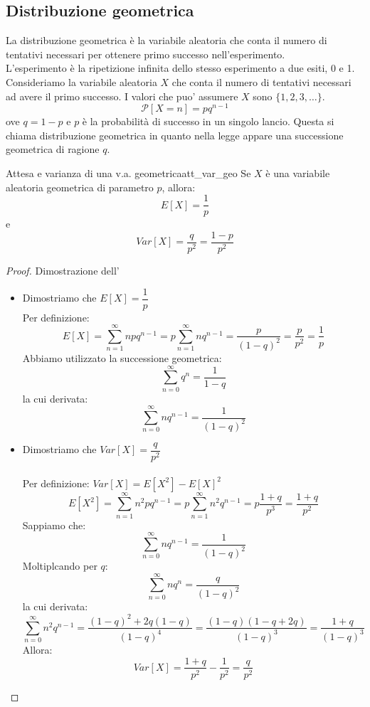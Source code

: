 \documentclass[12pt]{report}
\newcounter{theorem}
\newcommand{\namerefl}[1]{%
	\bgroup
	\let\nmu\MakeLowercase
	\nameref{#1}\egroup}
\newcommand{\nmu}{}
\begin{document}
  	 	\subsection{Distribuzione geometrica}
  	 	La distribuzione geometrica è la variabile aleatoria che conta il numero di tentativi necessari per ottenere primo successo nell'esperimento. \\
  	 	L'esperimento è la ripetizione infinita dello stesso esperimento a due esiti, 0 e 1. Consideriamo la variabile aleatoria $X$ che conta il numero di tentativi necessari ad avere il primo successo. I valori che puo' assumere $X$ sono $\{1, 2, 3, \dots\}$.
  	 	\[
  	 	\mathcal{P}[X = n] = pq^{n-1}
  	 	\]
  	 	ove $q = 1-p$ e $p$ è la probabilità di successo in un singolo lancio. Questa si chiama distribuzione geometrica in quanto nella legge appare una successione geometrica di ragione $q$.
  	 	\begin{theorem}{\nmu Attesa e varianza di una v.a. geometrica}{att_var_geo}
  	 		Se $X$ è una variabile aleatoria geometrica di parametro $p$, allora:
  	 		\[
  	 		E[X] = \frac{1}{p}
  	 		\]
  	 		e
  	 		\[
  	 		Var[X] = \frac{q}{p^2} = \frac{1-p}{p^2}
  	 		\]
  	 	\end{theorem}
  	 	\begin{proof}{Dimostrazione dell'\namerefl{th:att_var_geo}} \quad\\
  	 		\begin{itemize}
  	 			\item Dimostriamo che $E[X] = \dfrac{1}{p}$ \\
  	 			Per definizione: \[
  	 			E[X] = \sum_{n=1}^{\infty}npq^{n-1} = p\sum_{n=1}^{\infty}nq^{n-1} = \frac{p}{(1-q)^2} = \frac{p}{p^2} = \frac{1}{p}\]
  	 		 	Abbiamo utilizzato la successione geometrica:
  	 		 	\[
  	 		 	\sum_{n=0}^{\infty}q^n = \frac{1}{1-q}
  	 		 	\]
  	 		 	la cui derivata:
  	 		 	\[
  	 		 	\sum_{n=0}^{\infty}nq^{n-1} = \frac{1}{(1-q)^2}
  	 		 	\]
  	 		 	\item Dimostriamo che $Var[X] = \dfrac{q}{p^2}$ \\ \quad \\
  	 		 	Per definizione: $Var[X] = E[X^2] - E[X]^2$ \\
  	 		 	\[
  	 		 	E[X^2] = \sum_{n=1}^{\infty}n^2pq^{n-1} = p\sum_{n=1}^{\infty}n^2q^{n-1} = p\frac{1+q}{p^3} = \frac{1+q}{p^2}
   	 		 	\]
  	 		 	Sappiamo che:
  	 		 	\[
  	 		 	\sum_{n=0}^{\infty}nq^{n-1} = \frac{1}{(1-q)^2}
  	 		 	\]
  	 		 	Moltiplcando per $q$:
  	 		 	\[
  	 		 	\sum_{n=0}^{\infty}nq^n = \frac{q}{(1-q)^2}
  	 		 	\]
  	 		 	la cui derivata:
  	 		 	\[
  	 		 	\sum_{n=0}^{\infty}n^2q^{n-1}=\frac{(1-q)^2+2q(1-q)}{(1-q)^4} = \frac{(1-q)(1-q+2q)}{(1-q)^3} = \frac{1+q}{(1-q)^3}
  	 		 	\]
  	 		 	Allora:
  	 		 	\[Var[X] = \frac{1+q}{p^2} - \frac{1}{p^2} = \frac{q}{p^2}\]
  	 		\end{itemize}
  	 	\end{proof}
\end{document}
